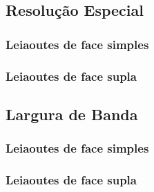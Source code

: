 \subsection{Resolução Especial}

\subsubsection*{Leiaoutes de face simples}

\subsubsection*{Leiaoutes de face supla}


\subsection{Largura de Banda}

\subsubsection*{Leiaoutes de face simples}

\subsubsection*{Leiaoutes de face supla}

